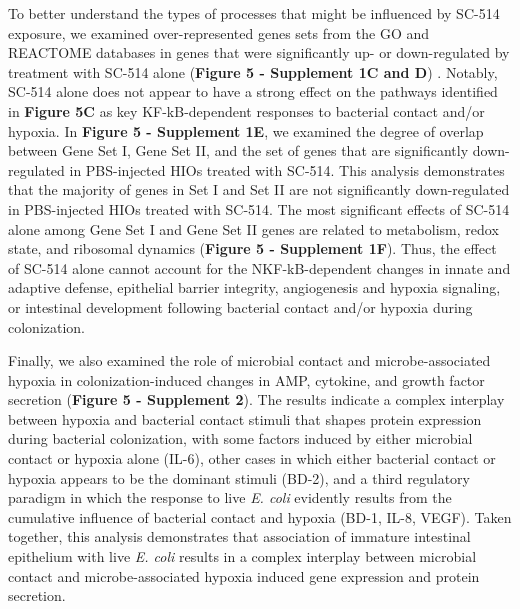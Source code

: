 \documentclass[9pt,lineo]{elife}
\begin{document}
To better understand the types of processes that might be influenced by SC-514 exposure, we examined over-represented genes sets from the GO and REACTOME databases in genes that were significantly up- or down-regulated by treatment with SC-514 alone (\textbf{Figure 5 - Supplement 1C and D}) . Notably, SC-514 alone does not appear to have a strong effect on the pathways identified in \textbf{Figure 5C} as key KF-kB-dependent responses to bacterial contact and/or hypoxia. In \textbf{Figure 5 - Supplement 1E}, we examined the degree of overlap between Gene Set I, Gene Set II, and the set of genes that are significantly down-regulated in PBS-injected HIOs treated with SC-514. This analysis demonstrates that the majority of genes in Set I and Set II are not significantly down-regulated in PBS-injected HIOs treated with SC-514. The most significant effects of SC-514 alone among Gene Set I and Gene Set II genes are related to metabolism, redox state, and ribosomal dynamics (\textbf{Figure 5 - Supplement 1F}). Thus, the effect of SC-514 alone cannot account for the NKF-kB-dependent changes in innate and adaptive defense, epithelial barrier integrity, angiogenesis and hypoxia signaling, or intestinal development following bacterial contact and/or hypoxia during colonization. 

Finally, we also examined the role of microbial contact and microbe-associated hypoxia in colonization-induced changes in AMP, cytokine, and growth factor secretion (\textbf{Figure 5 - Supplement 2}). The results indicate a complex interplay between hypoxia and bacterial contact stimuli that shapes protein expression during bacterial colonization, with some factors induced by either microbial contact or hypoxia alone (IL-6), other cases in which either bacterial contact or hypoxia appears to be the dominant stimuli (BD-2), and a third regulatory paradigm in which the response to live \emph{E. coli} evidently results from the cumulative influence of bacterial contact and hypoxia (BD-1, IL-8, VEGF). Taken together, this analysis demonstrates that association of immature intestinal epithelium with live \emph{E. coli} results in a complex interplay between microbial contact and microbe-associated hypoxia induced gene expression and protein secretion. 
\end{document}
